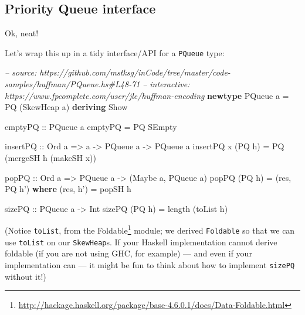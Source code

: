 \documentclass[]{article}
\newenvironment{Shaded}{\begin{snugshade}}{\end{snugshade}}
\newcommand{\CommentTok}[1]{\textcolor[rgb]{0.56,0.35,0.01}{\textit{#1}}}
\newcommand{\DataTypeTok}[1]{\textcolor[rgb]{0.13,0.29,0.53}{#1}}
\newcommand{\FunctionTok}[1]{\textcolor[rgb]{0.00,0.00,0.00}{#1}}
\newcommand{\KeywordTok}[1]{\textcolor[rgb]{0.13,0.29,0.53}{\textbf{#1}}}
\newcommand{\NormalTok}[1]{#1}
\newcommand{\OtherTok}[1]{\textcolor[rgb]{0.56,0.35,0.01}{#1}}
\renewcommand{\href}[2]{#2\footnote{\url{#1}}}
\begin{document}
\hypertarget{priority-queue-interface}{%
\subsection{Priority Queue interface}\label{priority-queue-interface}}

Ok, neat!

Let's wrap this up in a tidy interface/API for a \texttt{PQueue} type:

\begin{Shaded}
\begin{Highlighting}[]
\CommentTok{-- source: https://github.com/mstksg/inCode/tree/master/code-samples/huffman/PQueue.hs#L48-71}
\CommentTok{-- interactive: https://www.fpcomplete.com/user/jle/huffman-encoding}
\KeywordTok{newtype} \DataTypeTok{PQueue}\NormalTok{ a }\FunctionTok{=} \DataTypeTok{PQ}\NormalTok{ (}\DataTypeTok{SkewHeap}\NormalTok{ a) }\KeywordTok{deriving} \DataTypeTok{Show}

\OtherTok{emptyPQ ::} \DataTypeTok{PQueue}\NormalTok{ a}
\NormalTok{emptyPQ }\FunctionTok{=} \DataTypeTok{PQ} \DataTypeTok{SEmpty}

\OtherTok{insertPQ ::} \DataTypeTok{Ord}\NormalTok{ a }\OtherTok{=>}\NormalTok{ a }\OtherTok{->} \DataTypeTok{PQueue}\NormalTok{ a }\OtherTok{->} \DataTypeTok{PQueue}\NormalTok{ a}
\NormalTok{insertPQ x (}\DataTypeTok{PQ}\NormalTok{ h) }\FunctionTok{=} \DataTypeTok{PQ}\NormalTok{ (mergeSH h (makeSH x))}

\OtherTok{popPQ ::} \DataTypeTok{Ord}\NormalTok{ a }\OtherTok{=>} \DataTypeTok{PQueue}\NormalTok{ a }\OtherTok{->}\NormalTok{ (}\DataTypeTok{Maybe}\NormalTok{ a, }\DataTypeTok{PQueue}\NormalTok{ a)}
\NormalTok{popPQ (}\DataTypeTok{PQ}\NormalTok{ h) }\FunctionTok{=}\NormalTok{ (res, }\DataTypeTok{PQ}\NormalTok{ h')}
  \KeywordTok{where}
\NormalTok{    (res, h') }\FunctionTok{=}\NormalTok{ popSH h}

\OtherTok{sizePQ ::} \DataTypeTok{PQueue}\NormalTok{ a }\OtherTok{->} \DataTypeTok{Int}
\NormalTok{sizePQ (}\DataTypeTok{PQ}\NormalTok{ h) }\FunctionTok{=}\NormalTok{ length (toList h)}
\end{Highlighting}
\end{Shaded}

(Notice \texttt{toList}, from the
\href{http://hackage.haskell.org/package/base-4.6.0.1/docs/Data-Foldable.html}{Foldable}
module; we derived \texttt{Foldable} so that we can use \texttt{toList} on our
\texttt{SkewHeap}s. If your Haskell implementation cannot derive foldable (if
you are not using GHC, for example) --- and even if your implementation can ---
it might be fun to think about how to implement \texttt{sizePQ} without it!)
\end{document}
